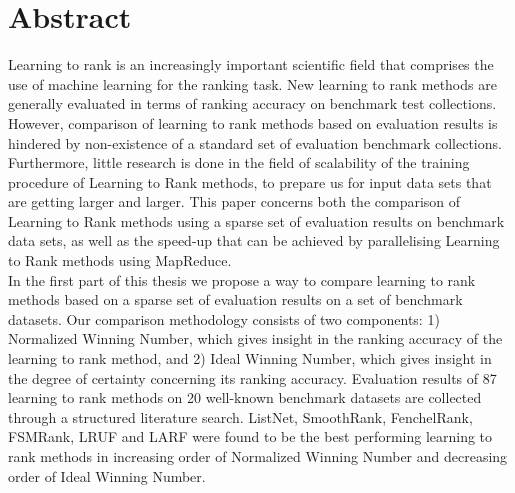 \begingroup
\let\clearpage\relax
\let\cleardoublepage\relax
\let\cleardoublepage\relax

\chapter*{Abstract}
Learning to rank is an increasingly important scientific field that comprises the use of machine learning for the ranking task. New learning to rank methods are generally evaluated in terms of ranking accuracy on benchmark test collections. However, comparison of learning to rank methods based on evaluation results is hindered by non-existence of a standard set of evaluation benchmark collections. Furthermore, little research is done in the field of scalability of the training procedure of Learning to Rank methods, to prepare us for input data sets that are getting larger and larger. This paper concerns both the comparison of Learning to Rank methods using a sparse set of evaluation results on benchmark data sets, as well as the speed-up that can be achieved by parallelising Learning to Rank methods using MapReduce.\\

In the first part of this thesis we propose a way to compare learning to rank methods based on a sparse set of evaluation results on a set of benchmark datasets. Our comparison methodology consists of two components: 1) Normalized Winning Number, which gives insight in the ranking accuracy of the learning to rank method, and 2) Ideal Winning Number, which gives insight in the degree of certainty concerning its ranking accuracy. Evaluation results of 87 learning to rank methods on 20 well-known benchmark datasets are collected through a structured literature search. ListNet, SmoothRank, FenchelRank, FSMRank, LRUF and LARF were found to be the best performing learning to rank methods in increasing order of Normalized Winning Number and decreasing order of Ideal Winning Number.\\

